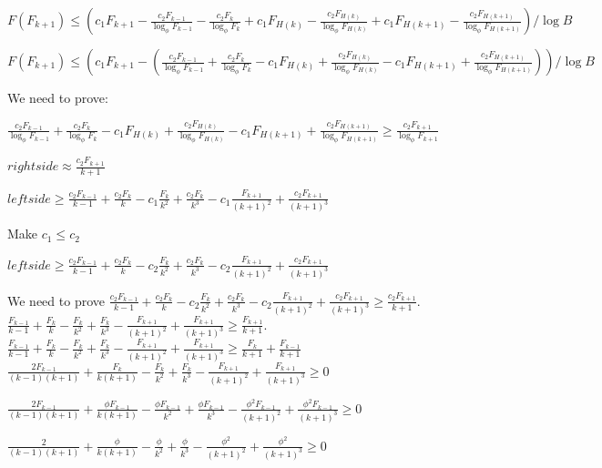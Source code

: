 \documentclass{book}
\begin{document}
$F(F_{k+1}) \leq (c_1F_{k+1}-\frac{c_2F_{k-1}}{\log_{\phi}F_{k-1}} -\frac{c_2F_k}{\log_{\phi}F_k} + c_1F_{H(k)}-\frac{c_2F_{H(k)}}{\log_{\phi}F_{H(k)}}+ c_1F_{H(k+1)}-\frac{c_2F_{H(k+1)}}{\log_{\phi}F_{H(k+1)}})/\log B$

$F(F_{k+1}) \leq (c_1F_{k+1}-(\frac{c_2F_{k-1}}{\log_{\phi}F_{k-1}} +\frac{c_2F_k}{\log_{\phi}F_k} - c_1F_{H(k)}+\frac{c_2F_{H(k)}}{\log_{\phi}F_{H(k)}} - c_1F_{H(k+1)}+\frac{c_2F_{H(k+1)}}{\log_{\phi}F_{H(k+1)}}))/\log B$

We need to prove:

$\frac{c_2F_{k-1}}{\log_{\phi}F_{k-1}} +\frac{c_2F_k}{\log_{\phi}F_k} - c_1F_{H(k)}+\frac{c_2F_{H(k)}}{\log_{\phi}F_{H(k)}} - c_1F_{H(k+1)}+\frac{c_2F_{H(k+1)}}{\log_{\phi}F_{H(k+1)}}\geq \frac{c_2F_{k+1}}{\log_{\phi}F_{k+1}}$

$rightside\approx \frac{c_2F_{k+1}}{k+1}$

$leftside\geq \frac{c_2F_{k-1}}{k-1} +\frac{c_2F_k}{k} - c_1\frac{F_k}{k^2}+\frac{c_2F_k}{k^3} - c_1\frac{F_{k+1}}{(k+1)^2}+\frac{c_2F_{k+1}}{(k+1)^3}$

Make $c_1 \leq c_2$

$leftside \geq \frac{c_2F_{k-1}}{k-1} +\frac{c_2F_k}{k} - c_2\frac{F_k}{k^2}+\frac{c_2F_k}{k^3} - c_2\frac{F_{k+1}}{(k+1)^2}+\frac{c_2F_{k+1}}{(k+1)^3}$


We need to prove $\frac{c_2F_{k-1}}{k-1} +\frac{c_2F_k}{k} -
c_2\frac{F_k}{k^2}+\frac{c_2F_k}{k^3} -
c_2\frac{F_{k+1}}{(k+1)^2}+\frac{c_2F_{k+1}}{(k+1)^3} \geq
\frac{c_2F_{k+1}}{k+1}$.\\
$\frac{F_{k-1}}{k-1} +\frac{F_k}{k} - \frac{F_k}{k^2}+\frac{F_k}{k^3} -
\frac{F_{k+1}}{(k+1)^2}+\frac{F_{k+1}}{(k+1)^3} \geq \frac{F_{k+1}}{k+1}$.\\
$\frac{F_{k-1}}{k-1} +\frac{F_k}{k} - \frac{F_k}{k^2}+\frac{F_k}{k^3} -
\frac{F_{k+1}}{(k+1)^2}+\frac{F_{k+1}}{(k+1)^3} \geq
\frac{F_{k}}{k+1}+\frac{F_{k-1}}{k+1}$\\
$\frac{2F_{k-1}}{(k-1)(k+1)} +\frac{F_k}{k(k+1)} - \frac{F_k}{k^2}+\frac{F_k}{k^3} - \frac{F_{k+1}}{(k+1)^2}+\frac{F_{k+1}}{(k+1)^3} \geq 0$

$\frac{2F_{k-1}}{(k-1)(k+1)} +\frac{\phi F_{k-1}}{k(k+1)} - \frac{\phi F_{k-1}}{k^2}+\frac{\phi F_{k-1}}{k^3} - \frac{\phi^2F_{k-1}}{(k+1)^2}+\frac{\phi^2F_{k-1}}{(k+1)^3} \geq 0$

$\frac{2}{(k-1)(k+1)} +\frac{\phi }{k(k+1)} - \frac{\phi }{k^2}+\frac{\phi }{k^3} - \frac{\phi^2}{(k+1)^2}+\frac{\phi^2}{(k+1)^3} \geq 0$
\end{document}
